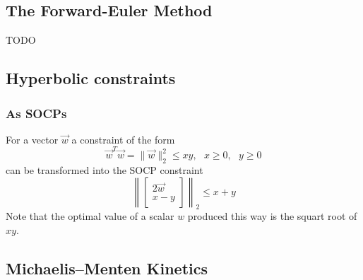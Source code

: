 \documentclass{article}
\begin{document}
\subsection{The Forward-Euler Method}
\label{sec:euler}

TODO


\subsection{Hyperbolic constraints}

\subsubsection{As SOCPs}

For a vector $\vec{w}$ a constraint of the form
\begin{equation}
\vec{w}^T\vec{w}=\lVert\vec{w}\rVert^2_2\le xy,~~~x\ge0,~~~y\ge0
\end{equation}
can be transformed into the SOCP constraint
\begin{equation}
\label{equ:hyperbolic-to-socp}
\left\lVert \begin{bmatrix} 2\vec{w} \\ x - y \end{bmatrix} \right\rVert_2 \le x+y
\end{equation}
Note that the optimal value of a scalar $w$ produced this way is the squart root of $xy$.





\subsection{Michaelis--Menten Kinetics}
\label{sec:mmkinetics}
\end{document}
